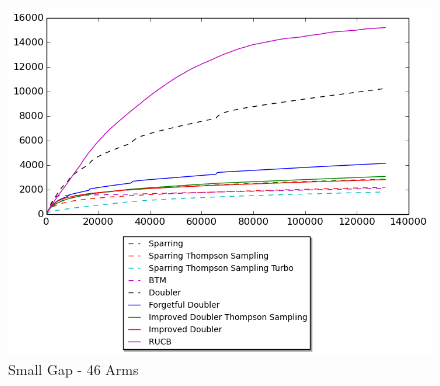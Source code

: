 \documentclass[MSc,beforeExam]{iitcsthesis}
\begin{document}
\newpage
\begin{figure}[h!]
\centering
  \includegraphics[scale=0.8]{graphs/close_arm_46.png}
  \caption{Small Gap - 46 Arms}
\end{figure}
\newpage
\end{document}
